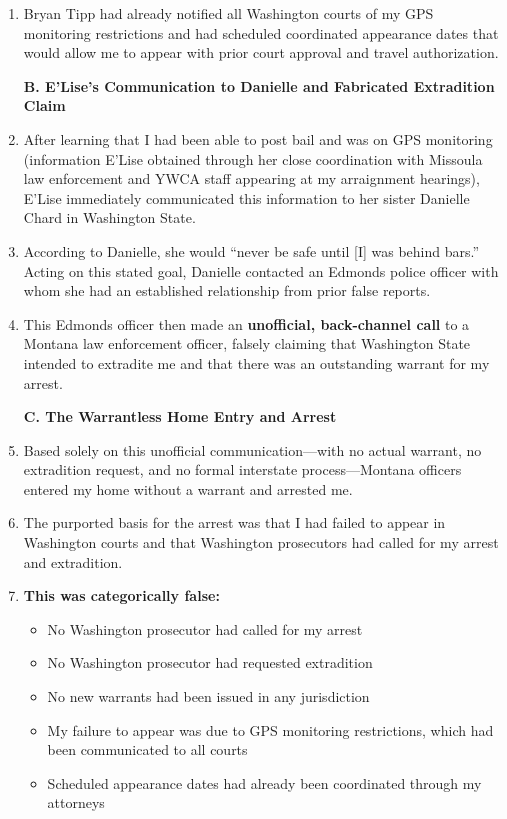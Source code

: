 \documentclass[12pt,letterpaper]{article}
\begin{document}
\begin{enumerate}
\item Bryan Tipp had already notified all Washington courts of my GPS monitoring restrictions and had scheduled coordinated appearance dates that would allow me to appear with prior court approval and travel authorization.

\textbf{B. E'Lise's Communication to Danielle and Fabricated Extradition Claim}

\item After learning that I had been able to post bail and was on GPS monitoring (information E'Lise obtained through her close coordination with Missoula law enforcement and YWCA staff appearing at my arraignment hearings), E'Lise immediately communicated this information to her sister Danielle Chard in Washington State.

\item According to Danielle, she would ``never be safe until [I] was behind bars.'' Acting on this stated goal, Danielle contacted an Edmonds police officer with whom she had an established relationship from prior false reports.

\item This Edmonds officer then made an \textbf{unofficial, back-channel call} to a Montana law enforcement officer, falsely claiming that Washington State intended to extradite me and that there was an outstanding warrant for my arrest.

\textbf{C. The Warrantless Home Entry and Arrest}

\item Based solely on this unofficial communication---with no actual warrant, no extradition request, and no formal interstate process---Montana officers entered my home without a warrant and arrested me.

\item The purported basis for the arrest was that I had failed to appear in Washington courts and that Washington prosecutors had called for my arrest and extradition.

\item \textbf{This was categorically false:}

\begin{itemize}
\item No Washington prosecutor had called for my arrest
\item No Washington prosecutor had requested extradition
\item No new warrants had been issued in any jurisdiction
\item My failure to appear was due to GPS monitoring restrictions, which had been communicated to all courts
\item Scheduled appearance dates had already been coordinated through my attorneys
\end{itemize}


\end{enumerate}
\end{document}
